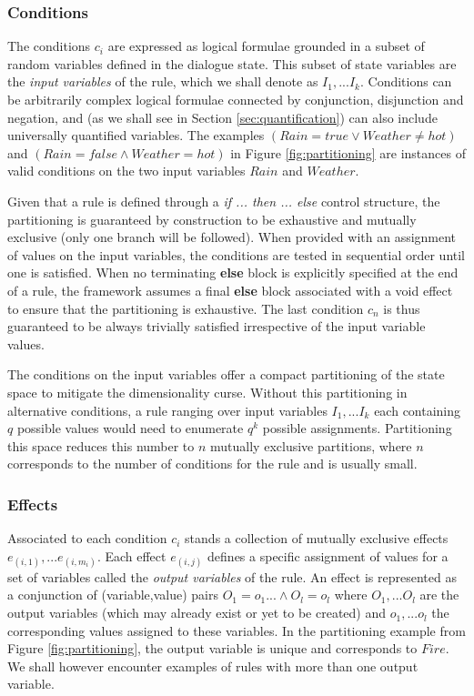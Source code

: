 \subsubsection*{Conditions}

The conditions $c_i$ are expressed as logical formulae grounded in a subset of random variables defined in the dialogue state. This subset of state variables are the \textit{input variables} of the rule, which we shall denote as $I_1,...I_{k}$. Conditions can be arbitrarily complex logical formulae connected by conjunction, disjunction and negation, and (as we shall see in Section \ref{sec:quantification}) can also include universally quantified variables. The examples $(\mathit{Rain}\!=\mathit{true} \lor \mathit{Weather}\!\neq\mathit{hot})$ and $(\mathit{Rain}\!=\mathit{false} \land \mathit{Weather}\!=\mathit{hot})$ in Figure \ref{fig:partitioning} are instances of valid conditions on the two input variables $Rain$ and $\mathit{Weather}$. 

Given that a rule is defined through a \textit{if ... then ... else} control structure, the partitioning is guaranteed by construction to be exhaustive and mutually exclusive (only one branch will be followed).  When provided with an assignment of values on the input variables, the conditions are tested in sequential order until one is satisfied. When no terminating \textbf{else} block is explicitly specified at the end of a rule, the framework assumes a final \textbf{else} block associated with a void effect to ensure that the partitioning is exhaustive. The last condition $c_n$ is thus guaranteed to be always trivially satisfied irrespective of the input variable values. 

The conditions on the input variables offer a compact partitioning of the state space to mitigate the dimensionality curse.  Without this partitioning in alternative conditions, a rule ranging over input variables $I_1,...I_{k}$ each containing $q$ possible values would need to enumerate $q^{k}$ possible assignments.  Partitioning this space reduces this number to $n$ mutually exclusive partitions, where $n$ corresponds to the number of conditions for the rule and is usually small. 


\subsubsection*{Effects}

Associated to each condition $c_i$ stands a collection of mutually exclusive effects $e_{(i,1)},... e_{(i,m_i)}$. Each effect $e_{(i,j)}$ defines a specific assignment of values for a set of variables called the \textit{output variables} of the rule.  An effect is represented as a conjunction of (variable,value) pairs $O_1\!=\!o_1 ... \land O_{l}\!=\!o_{l}$ where $O_1,... O_{l}$ are the output variables (which may already exist or yet to be created) and $o_1,...o_{l}$ the corresponding values assigned to these variables. In the partitioning example from Figure \ref{fig:partitioning}, the output variable is unique and corresponds to $Fire$. We shall however encounter examples of rules with more than one output variable. 

